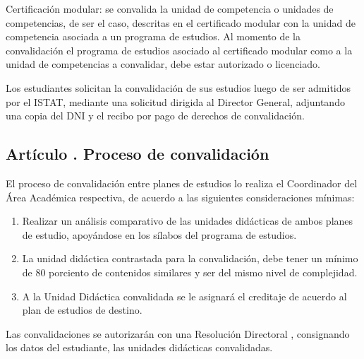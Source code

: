\begin{enumerate}
Certificación modular: se convalida la unidad de competencia o unidades de competencias, de ser el caso, descritas en el certificado modular con la unidad de competencia asociada a un programa de estudios. Al momento de la convalidación el programa de estudios asociado al certificado modular como a la unidad de competencias a convalidar, debe estar autorizado o licenciado.

Los estudiantes solicitan la convalidación de sus estudios luego de ser admitidos por el ISTAT, mediante una solicitud dirigida al Director General, adjuntando una copia del DNI y el recibo por pago de derechos de convalidación.
\end{enumerate}
\subsection{Artículo . Proceso de convalidación}
\addtocounter{ns}{1}
El proceso de convalidación entre planes de estudios lo realiza el Coordinador del Área Académica respectiva, de acuerdo a las siguientes consideraciones mínimas: 
\begin{enumerate}
\item Realizar un análisis comparativo de las unidades didácticas de ambos planes de estudio, apoyándose en los sílabos del programa de estudios. 
\item La unidad didáctica contrastada para la convalidación, debe tener un mínimo de 80 porciento de contenidos similares y ser del mismo nivel de complejidad. 
\item A la Unidad Didáctica convalidada se le asignará el creditaje de acuerdo al plan de estudios de destino.
\end{enumerate}
Las convalidaciones se autorizarán con una Resolución Directoral , consignando los datos del estudiante, las unidades didácticas convalidadas.
